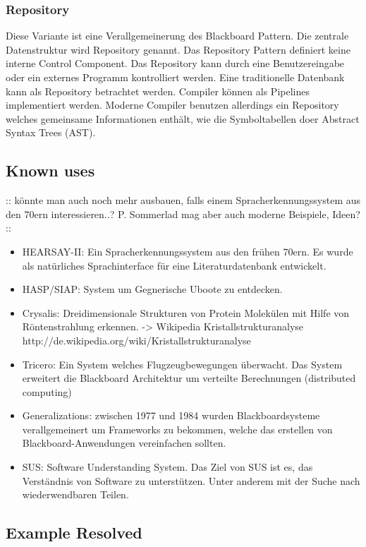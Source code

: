\subsubsection*{Repository}


Diese Variante ist eine Verallgemeinerung des Blackboard Pattern. Die zentrale Datenstruktur wird Repository genannt. Das Repository Pattern definiert keine interne Control Component. Das Repository kann durch eine Benutzereingabe oder ein externes Programm kontrolliert werden. Eine traditionelle Datenbank kann als Repository betrachtet werden. Compiler können als Pipelines implementiert werden. Moderne Compiler benutzen allerdings ein Repository welches gemeinsame Informationen enthält, wie die Symboltabellen doer Abstract Syntax Trees (AST).

\subsection*{Known uses}


:: könnte man auch noch mehr ausbauen, falls einem Spracherkennungssystem aus den 70ern interessieren..? P. Sommerlad mag aber auch moderne Beispiele, Ideen? ::

\begin{itemize}
	\item HEARSAY-II: Ein Spracherkennungssystem aus den frühen 70ern. Es wurde als natürliches Sprachinterface für eine Literaturdatenbank entwickelt.
	\item HASP/SIAP: System um Gegnerische Uboote zu entdecken.
	\item Crysalis: Dreidimensionale Strukturen von Protein Molekülen mit Hilfe von Röntenstrahlung erkennen. -> Wikipedia Kristallstrukturanalyse http://de.wikipedia.org/wiki/Kristallstrukturanalyse
	\item Tricero: Ein System welches Flugzeugbewegungen überwacht. Das System erweitert die Blackboard Architektur um verteilte Berechnungen (distributed computing)
	\item Generalizations: zwischen 1977 und 1984 wurden Blackboardsysteme verallgemeinert um Frameworks zu bekommen, welche das erstellen von Blackboard-Anwendungen vereinfachen sollten.
	\item SUS: Software Understanding System. Das Ziel von SUS ist es, das Verständnis von Software zu unterstützen. Unter anderem mit der Suche nach wiederwendbaren Teilen.
\end{itemize}

\subsection*{Example Resolved}

